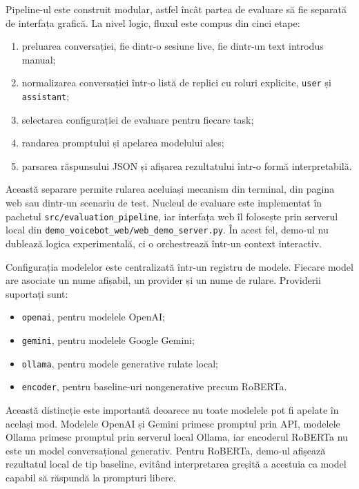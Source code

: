 Pipeline-ul este construit modular, astfel încât partea de evaluare să fie separată de interfața grafică. La nivel logic, fluxul este compus din cinci etape:

\begin{enumerate}
    \item preluarea conversației, fie dintr-o sesiune live, fie dintr-un text introdus manual;
    \item normalizarea conversației într-o listă de replici cu roluri explicite, \texttt{user} și \texttt{assistant};
    \item selectarea configurației de evaluare pentru fiecare task;
    \item randarea promptului și apelarea modelului ales;
    \item parsarea răspunsului JSON și afișarea rezultatului într-o formă interpretabilă.
\end{enumerate}

Această separare permite rularea aceluiași mecanism din terminal, din pagina web sau dintr-un scenariu de test. Nucleul de evaluare este implementat în pachetul \texttt{src/evaluation\_pipeline}, iar interfața web îl folosește prin serverul local din \texttt{demo\_voicebot\_web/web\_demo\_server.py}. În acest fel, demo-ul nu dublează logica experimentală, ci o orchestrează într-un context interactiv.

Configurația modelelor este centralizată într-un registru de modele. Fiecare model are asociate un nume afișabil, un provider și un nume de rulare. Providerii suportați sunt:

\begin{itemize}
    \item \texttt{openai}, pentru modelele OpenAI;
    \item \texttt{gemini}, pentru modelele Google Gemini;
    \item \texttt{ollama}, pentru modele generative rulate local;
    \item \texttt{encoder}, pentru baseline-uri nongenerative precum RoBERTa.
\end{itemize}

Această distincție este importantă deoarece nu toate modelele pot fi apelate în același mod. Modelele OpenAI și Gemini primesc promptul prin API, modelele Ollama primesc promptul prin serverul local Ollama, iar encoderul RoBERTa nu este un model conversațional generativ. Pentru RoBERTa, demo-ul afișează rezultatul local de tip baseline, evitând interpretarea greșită a acestuia ca model capabil să răspundă la prompturi libere.

